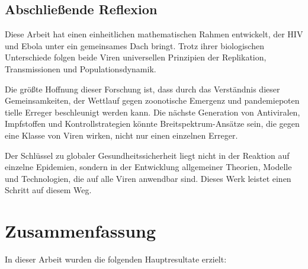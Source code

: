 ﻿\documentclass[a4paper,12pt]{article}
\theoremstyle{definition}
\begin{document}
\subsection{Abschließende Reflexion}

Diese Arbeit hat einen einheitlichen mathematischen Rahmen entwickelt, der HIV und Ebola unter ein gemeinsames Dach bringt. Trotz ihrer biologischen Unterschiede folgen beide Viren universellen Prinzipien der Replikation, Transmissionen und Populationsdynamik.

Die größte Hoffnung dieser Forschung ist, dass durch das Verständnis dieser Gemeinsamkeiten, der Wettlauf gegen zoonotische Emergenz und pandemiepoten tielle Erreger beschleunigt werden kann. Die nächste Generation von Antiviralen, Impfstoffen und Kontrollstrategien könnte Breitspektrum-Ansätze sein, die gegen eine Klasse von Viren wirken, nicht nur einen einzelnen Erreger.

Der Schlüssel zu globaler Gesundheitssicherheit liegt nicht in der Reaktion auf einzelne Epidemien, sondern in der Entwicklung allgemeiner Theorien, Modelle und Technologien, die auf alle Viren anwendbar sind. Dieses Werk leistet einen Schritt auf diesem Weg.

\section{Zusammenfassung}

In dieser Arbeit wurden die folgenden Hauptresultate erzielt:
\end{document}
